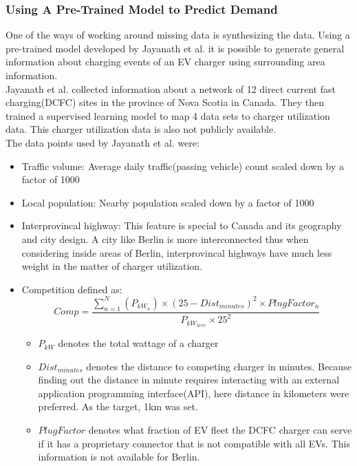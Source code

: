 \subsubsection{Using A Pre-Trained Model to Predict Demand}
One of the ways of working around missing data is synthesizing the data. Using a pre-trained model developed by Jayanath et al.\cite{Jayanath2024} it is possible to generate general information about charging events of an EV charger using surrounding area information.\\
Jayanath et al. collected information about a network of 12 direct current fast charging(DCFC) sites in the province of Nova Scotia in Canada. They then trained a supervised learning model to map 4 data sets to charger utilization data. This charger utilization data is also not publicly available.\\
The data points used by Jayanath et al. were:
\begin{itemize}
    \item Traffic volume: Average daily traffic(passing vehicle) count scaled down by a factor of 1000
    \item Local population: Nearby population scaled down by a factor of 1000
    \item Interprovincal highway: This feature is special to Canada and its geography and city design. A city like Berlin is more interconnected thus when considering inside areas of Berlin, interprovincal highways have much less weight in the matter of charger utilization.
    \item Competition defined as:
    \[
        Comp = \frac{\sum^N_{n=1} (P_{kW_n}) \times (25 - Dist_{minutes})^2 \times PlugFactor_n}{P_{kW_{here}} \times 25^2}
    \]
    \begin{itemize}
        \item $P_{kW}$ denotes the total wattage of a charger
        \item $Dist_{minutes}$ denotes the distance to competing charger in minutes. Because finding out the distance in minute requires interacting with an external application programming interface(API), here distance in kilometers were preferred. As the target, 1km was set.
        \item $PlugFactor$ denotes what fraction of EV fleet the \gls{DCFC} charger can serve if it has a proprietary connector that is not compatible with all EVs. This information is not available for Berlin.
    \end{itemize}
\end{itemize}
